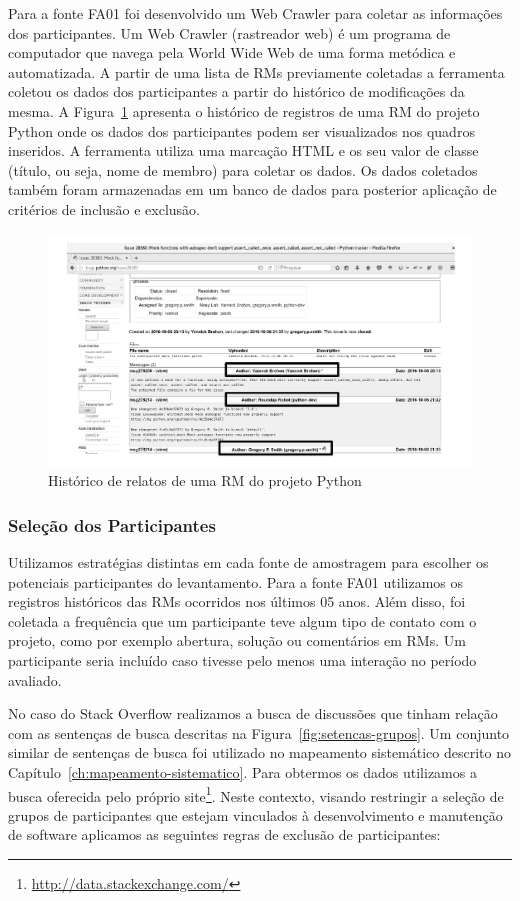 Para a fonte FA01 foi desenvolvido um Web Crawler para coletar as informações
dos participantes. Um Web Crawler (rastreador web) é um programa de computador
que navega pela World Wide Web de uma forma metódica e automatizada.  A partir
de uma lista de RMs previamente coletadas a ferramenta coletou os dados dos
participantes a partir do histórico de modificações da mesma. A
Figura~\ref{fig:historico-rm-python} apresenta o histórico de registros de uma
RM do projeto Python onde os dados dos participantes podem ser visualizados nos
quadros inseridos. A ferramenta utiliza uma marcação HTML e os seu valor de
classe (título, ou seja, nome de membro) para coletar os dados. Os dados
coletados também foram armazenadas em um banco de dados para posterior aplicação
de critérios de inclusão e exclusão.

\begin{figure}[htpb]
	\centering
	\includegraphics[width=0.6\linewidth]{./chapter-pesquisa-com-profissionais/img/historico-rm-python.pdf}
	\caption{Histórico de relatos de uma RM do projeto Python}
\label{fig:historico-rm-python}
\end{figure}

\subsubsection{Seleção dos Participantes}
\label{subsubsec:pesquisa_profissionais_plano_pesquisa}

Utilizamos estratégias distintas em cada fonte de amostragem para escolher os
potenciais participantes do levantamento. Para a fonte FA01 utilizamos os
registros históricos das RMs ocorridos nos últimos 05 anos. Além disso, foi
coletada a frequência que um participante teve algum tipo de contato com o
projeto, como por exemplo abertura, solução ou comentários em RMs. Um
participante seria incluído caso tivesse pelo menos uma interação no período
avaliado.

No caso do Stack Overflow realizamos a busca de discussões que tinham relação
com as sentenças de busca descritas na Figura~\ref{fig:setencas-grupos}. Um
conjunto similar de sentenças de busca foi utilizado no mapeamento sistemático
descrito no Capítulo~\ref{ch:mapeamento-sistematico}. Para obtermos os dados
utilizamos a busca oferecida pelo próprio
site\footnote{\url{http://data.stackexchange.com/}}. Neste contexto, visando
restringir a seleção de grupos de participantes que estejam vinculados à
desenvolvimento e manutenção de software aplicamos as seguintes regras de
exclusão de participantes:

